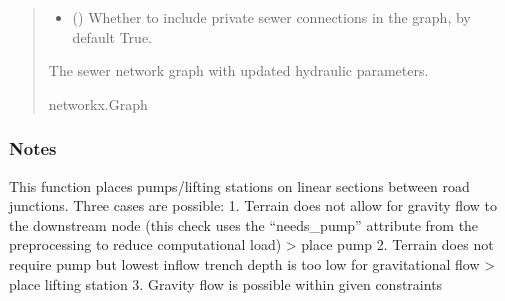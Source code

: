 \documentclass[letterpaper,10pt,english]{sphinxmanual}
\begin{document}
\begin{fulllineitems}
\begin{quote}
\begin{description}
\begin{itemize}
\item {} 
\sphinxAtStartPar
{} (\sphinxstyleliteralemphasis{\sphinxupquote{, }}) \textendash{} Whether to include private sewer connections in the graph, by default True.

\end{itemize}

\sphinxAtStartPar
The sewer network graph with updated hydraulic parameters.

\sphinxAtStartPar
networkx.Graph

\end{description}\end{quote}
\subsubsection*{Notes}

\sphinxAtStartPar
This function places pumps/lifting stations on linear sections between road junctions.
Three cases are possible:
1. Terrain does not allow for gravity flow to the downstream node (this check uses the “needs\_pump” attribute from the preprocessing
to reduce computational load) \sphinxhyphen{}\textgreater{} place pump
2. Terrain does not require pump but lowest inflow trench depth is too low for gravitational flow \sphinxhyphen{}\textgreater{} place lifting station
3. Gravity flow is possible within given constraints

\end{fulllineitems}

\end{document}
